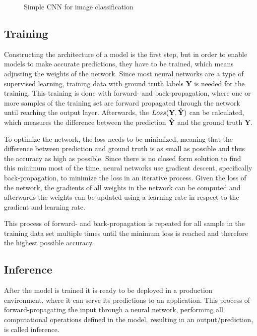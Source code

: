 \begin{figure}[!htb]
    \centering
    \resizebox{.95\linewidth}{!}{}
    \caption{Simple CNN for image classification}
    \label{fig:simpleCNN}
\end{figure}

\subsection{Training}
Constructing the architecture of a model is the first step, but in order to enable models to make accurate predictions, they have to be trained, which means adjusting the weights of the network. 
Since most neural networks are a type of supervised learning, training data with ground truth labels $\mathbf{Y}$ is needed for the training.
This training is done with forward- and back-propagation, where one or more samples of the training set are forward propagated through the network until reaching the output layer. Afterwards, the $Loss\mathbf{(Y,\Hat{Y})}$ can be calculated, which measures the difference between the prediction $\mathbf{\Hat{Y}}$ and the ground truth $\mathbf{Y}$.

To optimize the network, the loss needs to be minimized, meaning that the difference between prediction and ground truth is as small as possible and thus the accuracy as high as possible.
Since there is no closed form solution to find this minimum most of the time, neural networks use gradient descent, specifically back-propagation, to minimize the loss in an iterative process.
Given the loss of the network, the gradients of all weights in the network can be computed and afterwards the weights can be updated using a learning rate in respect to the gradient and learning rate.

This process of forward- and back-propagation is repeated for all sample in the training data set multiple times until the minimum loss is reached and therefore the highest possible accuracy.

\subsection{Inference}

After the model is trained it is ready to be deployed in a production environment, where it can serve its predictions to an application. This process of forward-propagating the input through a neural network, performing all computational operations defined in the model, resulting in an output/prediction, is called inference.


